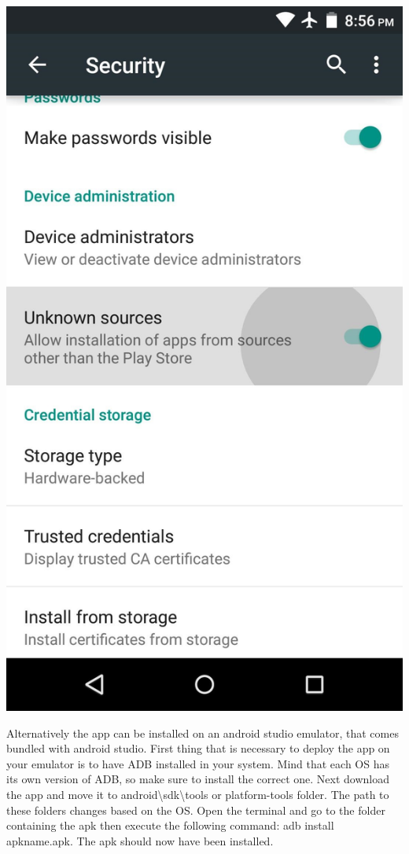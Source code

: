 \begin{center}
   \includegraphics[scale=0.18]{resources/unknowsources.jpg}
\end{center}


Alternatively the app can be installed on an android studio emulator, that comes bundled with android studio.
First thing that is necessary to deploy the app on your emulator is to have ADB installed in your system. Mind that each OS has its own version of ADB, so make sure to install the correct one.
Next download the app and move it to android\textbackslash{}sdk\textbackslash{}tools or platform-tools folder. The path to these folders changes based on the OS.
Open the terminal and go to the folder containing the apk then execute the following command:
adb install apkname.apk.
The apk should now have been installed.

